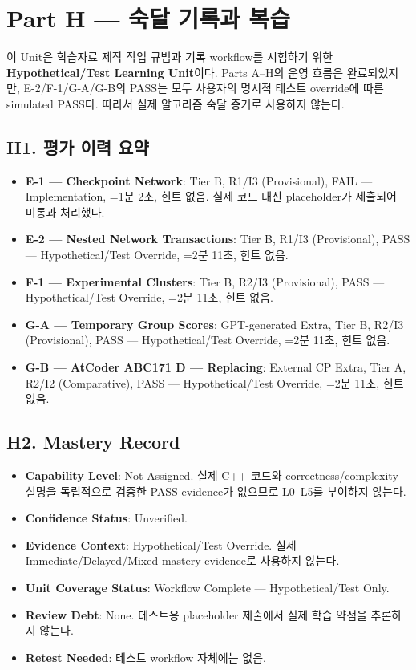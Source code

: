 \section{Part H --- 숙달 기록과 복습}

\begin{notebox}[S117-A 종료 상태]
이 Unit은 학습자료 제작 작업 규범과 기록 workflow를 시험하기 위한 \textbf{Hypothetical/Test Learning Unit}이다. Parts A--H의 운영 흐름은 완료되었지만, E-2/F-1/G-A/G-B의 PASS는 모두 사용자의 명시적 테스트 override에 따른 simulated PASS다. 따라서 실제 알고리즘 숙달 증거로 사용하지 않는다.
\end{notebox}

\subsection{H1. 평가 이력 요약}
\begin{itemize}
\item \textbf{E-1 --- Checkpoint Network}: Tier B, R1/I3 (Provisional), FAIL --- Implementation, =1분 2초, 힌트 없음. 실제 코드 대신 placeholder가 제출되어 미통과 처리했다.
\item \textbf{E-2 --- Nested Network Transactions}: Tier B, R1/I3 (Provisional), PASS --- Hypothetical/Test Override, =2분 11초, 힌트 없음.
\item \textbf{F-1 --- Experimental Clusters}: Tier B, R2/I3 (Provisional), PASS --- Hypothetical/Test Override, =2분 11초, 힌트 없음.
\item \textbf{G-A --- Temporary Group Scores}: GPT-generated Extra, Tier B, R2/I3 (Provisional), PASS --- Hypothetical/Test Override, =2분 11초, 힌트 없음.
\item \textbf{G-B --- AtCoder ABC171 D --- Replacing}: External CP Extra, Tier A, R2/I2 (Comparative), PASS --- Hypothetical/Test Override, =2분 11초, 힌트 없음.
\end{itemize}

\subsection{H2. Mastery Record}
\begin{itemize}
\item \textbf{Capability Level}: Not Assigned. 실제 C++ 코드와 correctness/complexity 설명을 독립적으로 검증한 PASS evidence가 없으므로 L0--L5를 부여하지 않는다.
\item \textbf{Confidence Status}: Unverified.
\item \textbf{Evidence Context}: Hypothetical/Test Override. 실제 Immediate/Delayed/Mixed mastery evidence로 사용하지 않는다.
\item \textbf{Unit Coverage Status}: Workflow Complete --- Hypothetical/Test Only.
\item \textbf{Review Debt}: None. 테스트용 placeholder 제출에서 실제 학습 약점을 추론하지 않는다.
\item \textbf{Retest Needed}: 테스트 workflow 자체에는 없음.
\end{itemize}

